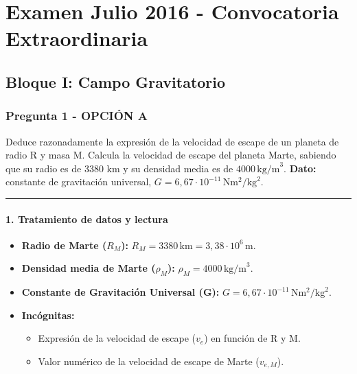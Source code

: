 \chapter{Examen Julio 2016 - Convocatoria Extraordinaria}
\label{chap:2016_jul_ext}

\section{Bloque I: Campo Gravitatorio}
\label{sec:grav_2016_jul_ext}

\subsection{Pregunta 1 - OPCIÓN A}
\label{subsec:1A_2016_jul_ext}
\begin{cajaenunciado}
Deduce razonadamente la expresión de la velocidad de escape de un planeta de radio R y masa M. Calcula la velocidad de escape del planeta Marte, sabiendo que su radio es de 3380 km y su densidad media es de $4000\,\text{kg/m}^3$.
\textbf{Dato:} constante de gravitación universal, $G=6,67\cdot10^{-11}\,\text{N}\text{m}^2/\text{kg}^2$.
\end{cajaenunciado}
\hrule

\subsubsection*{1. Tratamiento de datos y lectura}
\begin{itemize}
    \item \textbf{Radio de Marte ($R_M$):} $R_M = 3380\,\text{km} = 3,38 \cdot 10^6\,\text{m}$.
    \item \textbf{Densidad media de Marte ($\rho_M$):} $\rho_M = 4000\,\text{kg/m}^3$.
    \item \textbf{Constante de Gravitación Universal (G):} $G=6,67\cdot10^{-11}\,\text{N}\text{m}^2/\text{kg}^2$.
    \item \textbf{Incógnitas:}
    \begin{itemize}
        \item Expresión de la velocidad de escape ($v_e$) en función de R y M.
        \item Valor numérico de la velocidad de escape de Marte ($v_{e,M}$).
    \end{itemize}
\end{itemize}

